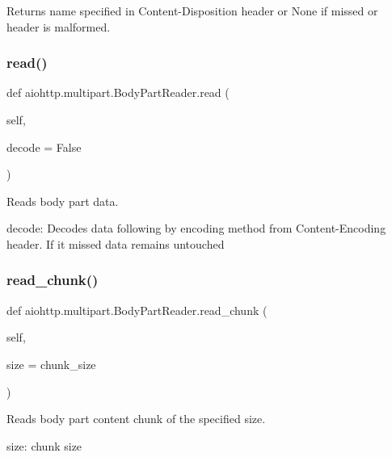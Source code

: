 \begin{DoxyVerb}Returns name specified in Content-Disposition header or None
if missed or header is malformed.
\end{DoxyVerb}
 \mbox{\label{classaiohttp_1_1multipart_1_1_body_part_reader_a51ce7158a5d803ce9e53f177fa96bb8c}} 
\subsubsection{\texorpdfstring{read()}{read()}}
{\footnotesize\ttfamily def aiohttp.\+multipart.\+Body\+Part\+Reader.\+read (\begin{DoxyParamCaption}\item[{}]{self,  }\item[{}]{decode = {\ttfamily False} }\end{DoxyParamCaption})}

\begin{DoxyVerb}Reads body part data.

decode: Decodes data following by encoding
method from Content-Encoding header. If it missed
data remains untouched
\end{DoxyVerb}
 \mbox{\label{classaiohttp_1_1multipart_1_1_body_part_reader_afb299e0e44d0b6bb95aeb5c1709121a4}} 
\subsubsection{\texorpdfstring{read\+\_\+chunk()}{read\_chunk()}}
{\footnotesize\ttfamily def aiohttp.\+multipart.\+Body\+Part\+Reader.\+read\+\_\+chunk (\begin{DoxyParamCaption}\item[{}]{self,  }\item[{}]{size = {\ttfamily chunk\+\_\+size} }\end{DoxyParamCaption})}

\begin{DoxyVerb}Reads body part content chunk of the specified size.

size: chunk size
\end{DoxyVerb}
 \mbox{\label{classaiohttp_1_1multipart_1_1_body_part_reader_a21ae160be9e586ccc7df7b468216db44}} 
